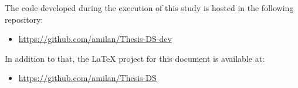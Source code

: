 \onehalfspacing



The code developed during the execution of this study is hosted in the following repository:

\begin{itemize}
    \item \href{https://github.com/amilan/Thesis-DS-dev}{https://github.com/amilan/Thesis-DS-dev}
\end{itemize}

In addition to that, the LaTeX project for this document is available at:

\begin{itemize}
    \item \href{https://github.com/amilan/Thesis-DS}{https://github.com/amilan/Thesis-DS}
\end{itemize}

